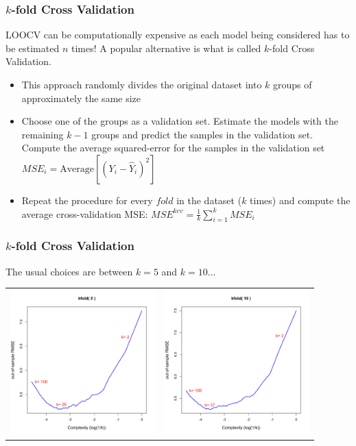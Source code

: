 \documentclass[flegn]{beamer}
\begin{document}


\begin{frame}
\frametitle{$k$-fold Cross Validation}

LOOCV can be computationally expensive as each model being considered has to be estimated $n$ times! A popular alternative is what is called {\color{blue}$k$-fold Cross Validation.}

\begin{itemize}
\item This approach randomly divides the original dataset into {\color{blue}$k$ groups} of approximately the same size
\item Choose one of the groups as a validation set. Estimate the models with the remaining $k-1$ groups and predict the samples in the validation set. Compute the average squared-error for the samples in the validation set $MSE_i = \mbox{Average}\left[(Y_i - \hat{Y}_i)^2\right]$ 
\item {\color{red}Repeat the procedure for every $fold$ in the dataset ($k$ times) and compute the average cross-validation MSE:
$
MSE^{kcv} = \frac{1}{k}\sum_{i=1}^k MSE_i
$}
\end{itemize}
\end{frame}



\begin{frame}
\frametitle{$k$-fold Cross Validation}
{\color{blue}The usual choices are between $k=5$ and $k=10$...}
\begin{center}
\begin{tabular}{cc}
\includegraphics[width=2.2in]{Boston_kfold5}&\includegraphics[width=2.2in]{Boston_kfold10}\\
\end{tabular}
\end{center}
\end{frame}
\end{document}
